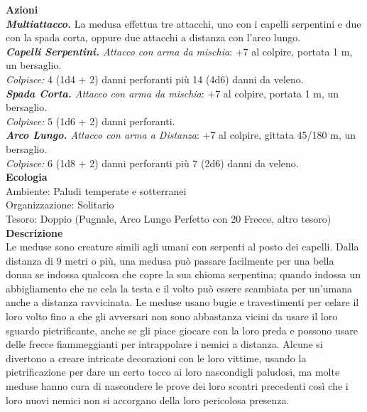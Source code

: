 \begin{multicols}{2}
\smallskip\textbf{Azioni}\\

\emph{\textbf{Multiattacco.}} La medusa effettua tre attacchi, uno con i capelli serpentini e due con la spada corta, oppure due attacchi a distanza con l'arco lungo.\\
\emph{\textbf{Capelli Serpentini.} Attacco con arma da mischia}: +7 al colpire, portata 1 m, un bersaglio.\\
\emph{Colpisce:} 4 (1d4 + 2) danni perforanti più 14 (4d6) danni da veleno.\\
\emph{\textbf{Spada Corta.} Attacco con arma da mischia}: +7 al colpire, portata 1 m, un bersaglio.\\
\emph{Colpisce:} 5 (1d6 + 2) danni perforanti.\\
\emph{\textbf{Arco Lungo.} Attacco con arma a Distanza}: +7 al colpire, gittata 45/180 m, un bersaglio.\\
\emph{Colpisce:} 6 (1d8 + 2) danni perforanti più 7 (2d6) danni da veleno.\\
\textbf{Ecologia}\\
Ambiente: Paludi temperate e sotterranei\\
Organizzazione: Solitario\\
Tesoro: Doppio (Pugnale, Arco Lungo Perfetto con 20 Frecce, altro tesoro)\\
\textbf{Descrizione}\\
Le meduse sono creature simili agli umani con serpenti al posto dei capelli. Dalla distanza di 9 metri o più, una medusa può passare facilmente per una bella donna se indossa qualcosa che copre la sua chioma serpentina; quando indossa un abbigliamento che ne cela la testa e il volto può essere scambiata per un’umana anche a distanza ravvicinata. Le meduse usano bugie e travestimenti per celare il loro volto fino a che gli avversari non sono abbastanza vicini da usare il loro sguardo pietrificante, anche se gli piace giocare con la loro preda e possono usare delle frecce fiammeggianti per intrappolare i nemici a distanza. Alcune si divertono a creare intricate decorazioni con le loro vittime, usando la pietrificazione per dare un certo tocco ai loro nascondigli paludosi, ma molte meduse hanno cura di nascondere le prove dei loro scontri precedenti così che i loro nuovi nemici non si accorgano della loro pericolosa presenza.\\


\end{multicols}
